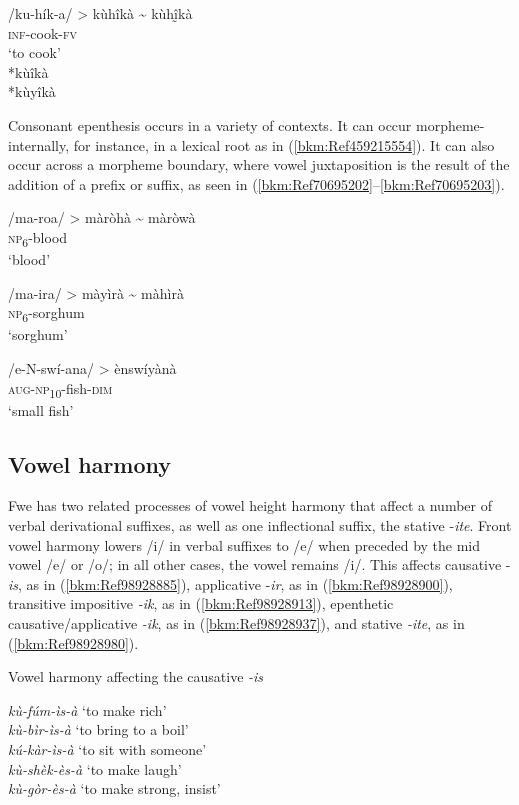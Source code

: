 \ex
\gll /ku-hík-a/ > kùhîkà {\textasciitilde} kùhḭ̂kà\\
\textsc{inf}-cook-\textsc{fv}\\
\glt ‘to cook’\\
*kùîkà\\
*kùyîkà
\z\z

Consonant epenthesis occurs in a variety of contexts. It can occur mor\-pheme-internally, for instance, in a lexical root as in (\ref{bkm:Ref459215554}). It can also occur across a morpheme boundary, where vowel juxtaposition is the result of the addition of a prefix or suffix, as seen in (\ref{bkm:Ref70695202}--\ref{bkm:Ref70695203}).

\ea
\label{bkm:Ref459215554}
/ma-roa/ > màròhà {\textasciitilde} màròwà\\
\textsc{np}\textsubscript{6}-blood\\
\glt ‘blood’
\z

\ea
\label{bkm:Ref70695202}
\gll /ma-ira/ > màyìrà {\textasciitilde} màhìrà\\
\textsc{np}\textsubscript{6}-sorghum\\
\glt ‘sorghum’
\z

\ea
\label{bkm:Ref70695203}
\gll /e-N-swí-ana/ > ènswíyànà\\
\textsc{aug}-\textsc{np}\textsubscript{10}-fish-\textsc{dim}\\
\glt ‘small fish’
\z
\subsection{Vowel harmony}
\label{bkm:Ref451863900}\hypertarget{Toc75352614}{}
Fwe has two related processes of vowel height harmony that affect a number of verbal deriva\-tional suffixes, as well as one inflectional suffix, the stative -\textit{ite}. Front vowel harmony lowers /i/ in verbal suffixes to /e/ when preceded by the mid vowel /e/ or /o/; in all other cases, the vowel remains /i/. This affects causative -\textit{is}, as in (\ref{bkm:Ref98928885}), applicative -\textit{ir}, as in (\ref{bkm:Ref98928900}), transitive impositive \textit{-ik}, as in (\ref{bkm:Ref98928913}), epenthetic causative/applicative \textit{-ik}, as in (\ref{bkm:Ref98928937}), and stative \textit{-ite}, as in (\ref{bkm:Ref98928980}).

\ea
\label{bkm:Ref98928885}
  Vowel harmony affecting the causative \textit{-is}

{\itshape kù-fúm-ìs-à} \tab  ‘to make rich’\\
{\itshape kù-bìr-ìs-à} \tab  ‘to bring to a boil’\\
{\itshape kú-kàr-ìs-à} \tab  ‘to sit with someone’\\
{\itshape kù-shèk-ès-à} \tab  ‘to make laugh’\\
{\itshape kù-gòr-ès-à} \tab  ‘to make strong, insist’\\
\z


